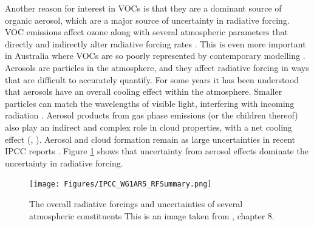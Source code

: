     Another reason for interest in VOCs is that they are a dominant source of 
    organic aerosol, which are a major source of uncertainty in radiative 
    forcing.
    VOC emissions affect ozone along with several atmospheric parameters that 
    directly and indirectly alter radiative forcing rates 
    \parencite[e.g.,][]{Arneth2008}.
    This is even more important in Australia where VOCs are so poorly 
    represented by contemporary modelling \parencite{Emmerson2016}.
    Aerosols are particles in the atmosphere, and they affect radiative forcing 
    in ways that are difficult to accurately quantify.
    For some years it has been understood that aerosols have an overall cooling 
    effect within the atmosphere.
    Smaller particles can match the wavelengths of visible light, interfering 
    with incoming radiation \parencite{Kanakidou2005}.
    Aerosol products from gas phase emissions (or the children thereof) also 
    play an indirect and complex role in cloud properties, with a net cooling 
    effect (\textcite{Kanakidou2005}, \textcite[Chapter 7,8]{IPCC_AR5_WG1}).
    Aerosol and cloud formation remain as large uncertainties in recent IPCC 
    reports \parencite{IPCC_Chapter2}.
    Figure \ref{LR:VOCs:IsopCascade:RF:fig_IPCC_RF_AR5} shows that uncertainty 
    from aerosol effects dominate the uncertainty in radiative forcing.
    
    
    \begin{figure}
      \texttt{[image: Figures/IPCC\_WG1AR5\_RFSummary.png]}
      \caption{%
        The overall radiative forcings and uncertainties of several atmospheric 
        constituents
        This is an image taken from \textcite{IPCC_AR5_WG1}, chapter 8.}
      \label{LR:VOCs:IsopCascade:RF:fig_IPCC_RF_AR5}
    \end{figure}    
    
